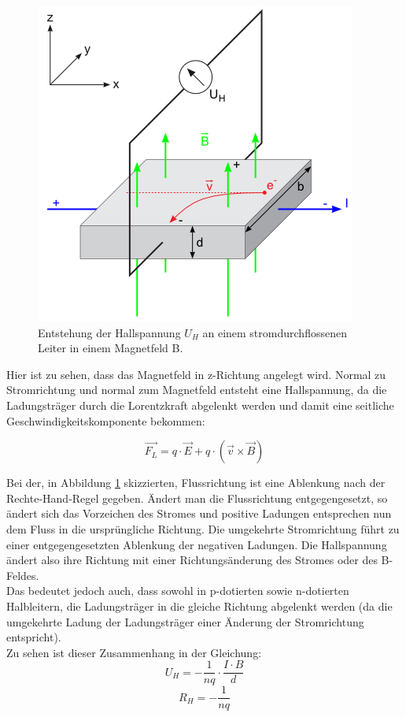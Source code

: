 \documentclass[12pt,a4paper]{article}
\begin{document}
\begin{multicols}{2}
\begin{figure}[H]
	\centering
	\includegraphics[scale=0.5]{./figures/hallspannung_aufbau.png}
	\caption{Entstehung der Hallspannung $U_H$ an einem stromdurchflossenen Leiter in einem Magnetfeld B.}
	\label{fig:hallspannung_aufbau}
\end{figure}

Hier ist zu sehen, dass das Magnetfeld  in z-Richtung angelegt wird. Normal zu Stromrichtung und normal zum Magnetfeld entsteht eine Hallspannung, da die Ladungsträger durch die Lorentzkraft abgelenkt werden und damit eine seitliche Geschwindigkeitskomponente bekommen:

$$\vec{F_{L}} = q \cdot \vec{E} + q \cdot (\vec{v} \times \vec{B})$$

Bei der, in Abbildung \ref{fig:hallspannung_aufbau} skizzierten, Flussrichtung ist eine Ablenkung nach der Rechte-Hand-Regel gegeben. Ändert man die Flussrichtung entgegengesetzt, so ändert sich das Vorzeichen des Stromes und positive Ladungen entsprechen nun dem Fluss in die ursprüngliche Richtung. Die umgekehrte Stromrichtung führt zu einer entgegengesetzten Ablenkung der negativen Ladungen. Die Hallspannung ändert also ihre Richtung mit einer Richtungsänderung des Stromes oder des B-Feldes.\\
Das bedeutet jedoch auch, dass sowohl in p-dotierten sowie n-dotierten Halbleitern, die Ladungsträger in die gleiche Richtung abgelenkt werden (da die umgekehrte Ladung der Ladungsträger einer Änderung der Stromrichtung entspricht).\\
Zu sehen ist dieser Zusammenhang in der Gleichung:
$$U_H = - \frac{1}{nq} \cdot \frac{I \cdot B}{d}$$
$$R_H=- \frac{1}{nq}$$


\end{multicols}
\end{document}
